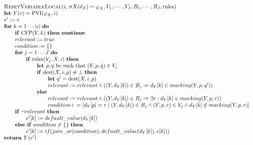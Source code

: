 \begin{equation*}
\begin{tabular}{l}
\textsc{ResetVariableLocal(}$i,$ $\sigma X(d_{X})=\varphi _{X},V_{1},\cdots
,V_{J},B_{1},\cdots ,B_{J},\mathrm{rules}$\textsc{)} \\ 
\textbf{let }$Y(e)=\mathrm{PVI}(\varphi _{X},i)$ \\ 
$e^{\prime }:=e$ \\ 
\textbf{for} $k=1\cdots \left\vert e\right\vert $ \textbf{do} \\ 
$\qquad $\textbf{if} $\mathrm{CFP}(Y,k)$ \textbf{then continue} \\ 
$\qquad relevant:=true$ \\ 
$\qquad condition:=\{\}$ \\ 
$\qquad $\textbf{for} $j=1\cdots J$ \textbf{do} \\ 
$\qquad \qquad $\textbf{if} $\mathrm{rules}(V_{j},X,i)$ \textbf{then} \\ 
$\qquad \qquad \qquad $\textbf{let }$p,q$ be such that $(Y,p,q)\in V_{j}$ \\ 
$\qquad \qquad \qquad $\textbf{if} $\mathrm{dest}(X,i,p)\neq \bot $ \textbf{%
then} \\ 
$\qquad \qquad \qquad \qquad $\textbf{let} $q^{\prime }=\mathrm{dest}(X,i,p)$
\\ 
$\qquad \qquad \qquad \qquad relevant:=relevant\wedge \left( \left(
Y,d_{Y}[k]\right) \in B_{j}\Rightarrow d_{Y}[k]\in marking(Y,p,q^{\prime
})\right) $ \\ 
$\qquad \qquad \qquad $\textbf{else} \\ 
$\qquad \qquad \qquad \qquad relevant:=relevant\wedge (\left(
Y,d_{Y}[k]\right) \in B_{j}\Rightarrow \exists r:d_{Y}[k]\in marking(Y,p,r))$
\\ 
$\qquad \qquad \qquad \qquad condition+=$ $[d_{Y}[p]=r\mid \left(
Y,d_{Y}[k]\right) \in B_{j}\wedge (Y,p,r)\in V_{j}\wedge d_{Y}[k]\notin
marking(Y,p,r)]$ \\ 
$\qquad $\textbf{if} $\lnot relevant$ \textbf{then} \\ 
$\qquad \qquad e^{\prime }[k]:=default\_value(d_{Y}[k])$ \\ 
$\qquad $\textbf{else if} $condition\neq \{\}$ \textbf{then} \\ 
$\qquad \qquad e^{\prime
}[k]:=if(join\_or(condition),default\_value(d_{Y}[k]),e[k]))$ \\ 
\textbf{return }$Y(e^{\prime })$%
\end{tabular}%
\end{equation*}%
\newpage
